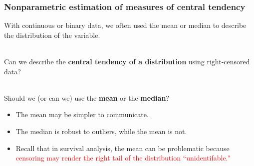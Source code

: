 \documentclass[10pt,t]{beamer}
\begin{document}
\begin{frame}
\frametitle{Nonparametric estimation of measures of central tendency}

With continuous or binary data, we often used the mean or median to describe the distribution of the variable.
\\ ~\ 

Can we describe the \textbf{central tendency of a distribution} using right-censored data?
\\ ~\ 

Should we (or can we) use the \textbf{mean} or the \textbf{median}?
\begin{itemize}
\item The mean may be simpler to communicate.
\item The median is robust to outliers, while the mean is not.
\item Recall that in survival analysis, the mean can be problematic because \textcolor{red}{censoring may render the right tail of the distribution ``unidentifable."}
\end{itemize}
\end{frame}

%
%
%
%
\end{document}
